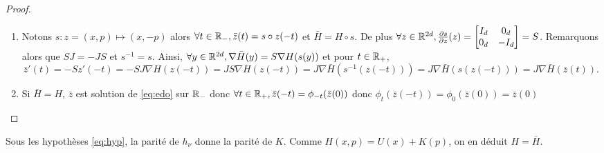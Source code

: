 \documentclass[10pt,a4paper]{article}
\begin{document}
\begin{proof}
	\begin{enumerate}
		\item   Notons $s : z = (x,p) \mapsto (x,-p)$ alors $\forall t \in \mathbb{R}_-, \bar{z}(t) = s \circ z (-t)$ et $\bar{H} = H \circ s$. De plus $\forall z \in \mathbb{R}^{2d}, \frac{\partial s}{\partial z}(z) = \begin{bmatrix} I_d & 0_d \\ 0_d & -I_d \end{bmatrix} = S$. Remarquons alors que $S J = - J S$ et $s^{-1} = s$. Ainsi, $\forall y \in \mathbb{R}^{2d}, \nabla \bar{H} (y) = S \nabla H (s(y))$ et pour $t \in \mathbb{R}_+$,
		  $$
		  \bar{z}'(t) = - S z'(-t) = - S J \nabla H (z(-t)) = J S \nabla H(z(-t)) =  J \nabla \bar{H} (s^{-1}(z(-t))) = J \nabla \bar{H} (s(z(-t))) = J \nabla \bar{H} (\bar{z}(t)).
		  $$
		\item Si $\bar{H} = H$, $\bar{z}$ est solution de \eqref{eq:edo} sur $\mathbb{R}_-$ donc $\forall t \in \mathbb{R}_+, \bar z(-t) = \phi_{-t}(\bar z(0))$ donc $\phi_t(\bar{z}(-t)) = \phi_0(\bar{z}(0)) = \bar{z}(0)$
	\end{enumerate}
\end{proof}

\begin{Rque}\label{rque:Hbar}
	Sous les hypothèses \eqref{eq:hyp}, la parité de $h_\nu$ donne la parité de $K$. Comme $H(x,p) = U(x)+K(p)$, on en déduit $H = \bar H$.
\end{Rque}
\end{document}
